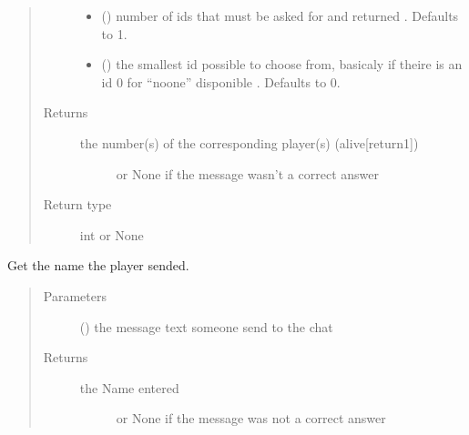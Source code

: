 \documentclass[letterpaper,10pt,english]{sphinxmanual}
\begin{document}
\begin{fulllineitems}
\begin{fulllineitems}
\begin{quote}
\begin{description}
\begin{itemize}
\item {} 
 (\sphinxstyleliteralemphasis{\sphinxupquote{, }}) \textendash{} number of ids that must be asked for and returned . Defaults to 1.

\item {} 
 (\sphinxstyleliteralemphasis{\sphinxupquote{, }}) \textendash{} the smallest id possible to choose from,
basicaly if theire is an id 0 for “noone” disponible . Defaults to 0.

\end{itemize}

\item[{Returns}] \leavevmode
\begin{description}
\item[{the number(s) of the corresponding player(s) (alive{[}return\sphinxhyphen{}1{]})}] \leavevmode
or None if the message wasn’t a correct answer

\end{description}


\item[{Return type}] \leavevmode
int or None

\end{description}\end{quote}

\end{fulllineitems}


\begin{fulllineitems}
\label{\detokenize{chatwolf:chatwolf.skypecommands.SkypeCommands.get_name}}
Get the name the player sended.
\begin{quote}\begin{description}
\item[{Parameters}] \leavevmode
{} () \textendash{} the message text someone send to the chat

\item[{Returns}] \leavevmode
\begin{description}
\item[{the Name entered}] \leavevmode
or None if the message was not a correct answer


\end{description}
\end{description}
\end{quote}
\end{fulllineitems}
\end{fulllineitems}
\end{document}
